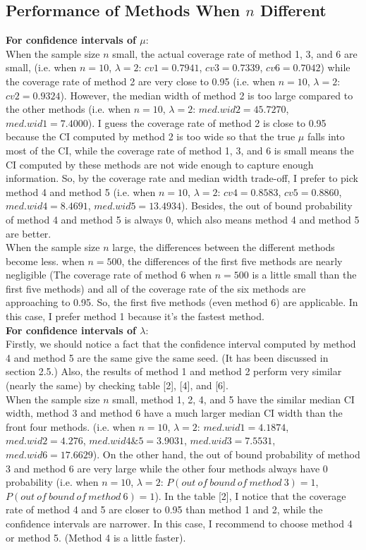 \documentclass[12pt]{article}
\begin{document}
\subsection{Performance of Methods When $n$ Different}
\textbf{For confidence intervals of $\mu$}:\\
 When the sample size $n$ small, the actual coverage rate of method 1, 3, and 6 are small, (i.e. when $n=10$, $\lambda=2$: $cv1=0.7941$, $cv3=0.7339$, $cv6=0.7042$) while the coverage rate of method 2 are very close to 0.95 (i.e. when $n=10$, $\lambda=2$: $cv2=0.9324$). However, the median width of method 2 is too large compared to the other methods (i.e. when $n=10$, $\lambda=2$: $med.wid2=45.7270$, $med.wid1=7.4000$).  I guess the coverage rate of method 2 is close to 0.95 because the CI computed by method 2 is too wide so that the true $\mu$ falls into most of the CI, while the coverage rate of method 1, 3, and 6 is small means the CI computed by these methods are not wide enough to capture enough information.  So, by the coverage rate and median width trade-off, I prefer to pick method 4 and method 5 (i.e. when $n=10$, $\lambda=2$:  $cv4=0.8583$, $cv5=0.8860$, $med.wid4=8.4691$, $med.wid5=13.4934$). Besides, the out of bound probability of method 4 and method 5 is always $0$, which also means method 4 and method 5 are better.\\

When the sample size $n$ large, the differences between the different methods become less. when $n=500$, the differences of the first five methods are nearly negligible (The coverage rate of method 6 when $n=500$ is a little small than the first five methods) and all of the coverage rate of the six methods are approaching to 0.95. So, the first five methods (even method 6) are applicable. In this case, I prefer method 1 because it's the fastest method. \\

\textbf{For confidence intervals of $\lambda$}:\\
Firstly, we should notice a fact that the confidence interval computed by method 4 and method 5 are the same give the same seed. (It has been discussed in section 2.5.)  Also, the results of method 1 and method 2 perform very similar (nearly the same) by checking table [2], [4], and [6].\\

When the sample size $n$ small,  method 1, 2, 4, and 5 have the similar median CI width, method 3 and method 6 have a much larger median CI width than the front four methods. (i.e. when $n=10$, $\lambda=2$:  $med.wid1=4.1874$, $med.wid2=4.276$, $med.wid4\&5=3.9031$, $med.wid3=7.5531$, $med.wid6=17.6629$). On the other hand, the out of bound probability of method 3 and method 6 are very large while the other four methods always have 0 probability (i.e. when $n=10$, $\lambda=2$:  $P(out \ of \ bound\ of \ method \ 3)=1$, $P(out \ of \ bound\ of \ method \ 6)=1$).  In the table [2], I notice that the coverage rate of method 4 and 5 are closer to 0.95 than method 1 and 2, while the confidence intervals are narrower. In this case, I recommend to choose method 4 or method 5. (Method 4 is a little faster).\\
\end{document}
